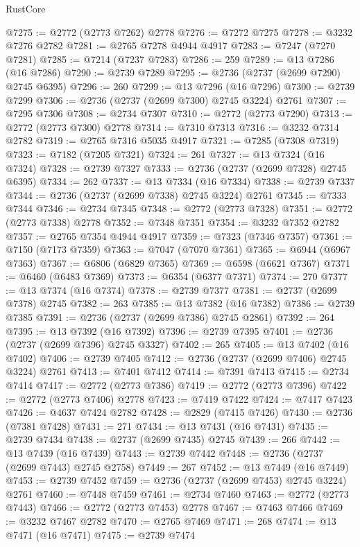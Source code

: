 \begin{lexlean}{RustCore}
\begin{coremodule}
@7275 := @2772 (@2773 @7262) @2778
@7276 := @7272 @7275
@7278 := @3232 @7276 @2782
@7281 := @2765 @7278 @4944 @4917
@7283 := @7247 (@7270 @7281)
@7285 := @7214 (@7237 @7283)
@7286 := 259
@7289 := @13 @7286 (@16 @7286)
@7290 := @2739 @7289
@7295 := @2736 (@2737 (@2699 @7290) @2745 @6395)
@7296 := 260
@7299 := @13 @7296 (@16 @7296)
@7300 := @2739 @7299
@7306 := @2736 (@2737 (@2699 @7300) @2745 @3224) @2761
@7307 := @7295 @7306
@7308 := @2734 @7307
@7310 := @2772 (@2773 @7290)
@7313 := @2772 (@2773 @7300) @2778
@7314 := @7310 @7313
@7316 := @3232 @7314 @2782
@7319 := @2765 @7316 @5035 @4917
@7321 := @7285 (@7308 @7319)
@7323 := @7182 (@7205 @7321)
@7324 := 261
@7327 := @13 @7324 (@16 @7324)
@7328 := @2739 @7327
@7333 := @2736 (@2737 (@2699 @7328) @2745 @6395)
@7334 := 262
@7337 := @13 @7334 (@16 @7334)
@7338 := @2739 @7337
@7344 := @2736 (@2737 (@2699 @7338) @2745 @3224) @2761
@7345 := @7333 @7344
@7346 := @2734 @7345
@7348 := @2772 (@2773 @7328)
@7351 := @2772 (@2773 @7338) @2778
@7352 := @7348 @7351
@7354 := @3232 @7352 @2782
@7357 := @2765 @7354 @4944 @4917
@7359 := @7323 (@7346 @7357)
@7361 := @7150 (@7173 @7359)
@7363 := @7047 (@7070 @7361)
@7365 := @6944 (@6967 @7363)
@7367 := @6806 (@6829 @7365)
@7369 := @6598 (@6621 @7367)
@7371 := @6460 (@6483 @7369)
@7373 := @6354 (@6377 @7371)
@7374 := 270
@7377 := @13 @7374 (@16 @7374)
@7378 := @2739 @7377
@7381 := @2737 (@2699 @7378) @2745
@7382 := 263
@7385 := @13 @7382 (@16 @7382)
@7386 := @2739 @7385
@7391 := @2736 (@2737 (@2699 @7386) @2745 @2861)
@7392 := 264
@7395 := @13 @7392 (@16 @7392)
@7396 := @2739 @7395
@7401 := @2736 (@2737 (@2699 @7396) @2745 @3327)
@7402 := 265
@7405 := @13 @7402 (@16 @7402)
@7406 := @2739 @7405
@7412 := @2736 (@2737 (@2699 @7406) @2745 @3224) @2761
@7413 := @7401 @7412
@7414 := @7391 @7413
@7415 := @2734 @7414
@7417 := @2772 (@2773 @7386)
@7419 := @2772 (@2773 @7396)
@7422 := @2772 (@2773 @7406) @2778
@7423 := @7419 @7422
@7424 := @7417 @7423
@7426 := @4637 @7424 @2782
@7428 := @2829 (@7415 @7426)
@7430 := @2736 (@7381 @7428)
@7431 := 271
@7434 := @13 @7431 (@16 @7431)
@7435 := @2739 @7434
@7438 := @2737 (@2699 @7435) @2745
@7439 := 266
@7442 := @13 @7439 (@16 @7439)
@7443 := @2739 @7442
@7448 := @2736 (@2737 (@2699 @7443) @2745 @2758)
@7449 := 267
@7452 := @13 @7449 (@16 @7449)
@7453 := @2739 @7452
@7459 := @2736 (@2737 (@2699 @7453) @2745 @3224) @2761
@7460 := @7448 @7459
@7461 := @2734 @7460
@7463 := @2772 (@2773 @7443)
@7466 := @2772 (@2773 @7453) @2778
@7467 := @7463 @7466
@7469 := @3232 @7467 @2782
@7470 := @2765 @7469
@7471 := 268
@7474 := @13 @7471 (@16 @7471)
@7475 := @2739 @7474

\end{coremodule}
\end{lexlean}
